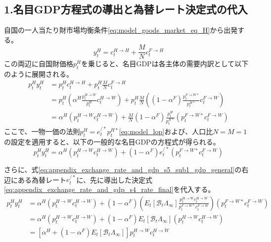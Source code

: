\subsection*{1.名目GDP方程式の導出と為替レート決定式の代入}
\label{sec:appendix_exchange_rate_and_gdp_s5_sub1}

自国の一人当たり財市場均衡条件\eqref{eq:model_goods_market_eq_H}から出発する。
\begin{equation}
    y_t^H=c_t^{H\to H}+\frac{M}{N}c_t^{F\to H}
    \label{eq:appendix_exchange_rate_and_gdp_s5_sub1_goods_raw}
\end{equation}
この両辺に自国財価格\(p_t^H\)を乗じると、名目GDPは各主体の需要内訳として以下のように展開される。
\begin{align}
    p_t^Hy_t^H&=p_t^Hc_t^{H\to H}+p_t^H\frac{M}{N}c_t^{F\to H} \nonumber \\
    &=p_t^H\left(\alpha^H\frac{p_t^{H\to W}}{p_t^H}c_t^{H\to W}\right)+p_t^H\frac{M}{N}\left((1-\alpha^F)\frac{p_t^{F\to W*}}{p_t^{H*}}c_t^{F\to W}\right) \nonumber \\
    &=\alpha^H(p_t^{H\to W}c_t^{H\to W})+\frac{M}{N}(1-\alpha^F)\frac{p_t^H}{p_t^{H*}}(p_t^{F\to W*}c_t^{F\to W})
    \label{eq:appendix_exchange_rate_and_gdp_s5_sub1_gdp_derivation}
\end{align}
ここで、一物一価の法則\(p_t^H=e_t^{/*}p_t^{H*}\)\eqref{eq:model_lop}および、人口比\(N=M=1\)の設定を適用すると、以下の一般的な名目GDPの方程式が得られる。
\begin{equation}
    p_t^Hy_t^H=\alpha^H(p_t^{H\to W}c_t^{H\to W})+(1-\alpha^F)e_t^{/*}(p_t^{F\to W*}c_t^{F\to W})
    \label{eq:appendix_exchange_rate_and_gdp_s5_sub1_gdp_general}
\end{equation}

さらに、式\eqref{eq:appendix_exchange_rate_and_gdp_s5_sub1_gdp_general}の右辺にある為替レート\(e_t^{/*}\)に、先に導出した決定式\eqref{eq:appendix_exchange_rate_and_gdp_s4_rate_final}を代入する。
\begin{align}
    p_t^Hy_t^H&=\alpha^H(p_t^{H\to W}c_t^{H\to W})+(1-\alpha^F)\left(E_t\left[\mathcal{B}_t\Lambda_{\infty}\right]\frac{p_t^{H\to W}c_t^{H\to W}}{p_t^{F\to W*}c_t^{F\to W}}\right)(p_t^{F\to W*}c_t^{F\to W}) \nonumber \\
    &=\alpha^H(p_t^{H\to W}c_t^{H\to W})+(1-\alpha^F)E_t\left[\mathcal{B}_t\Lambda_{\infty}\right](p_t^{H\to W}c_t^{H\to W}) \nonumber \\
    &=\left[\alpha^H+(1-\alpha^F)E_t\left[\mathcal{B}_t\Lambda_{\infty}\right]\right]p_t^{H\to W}c_t^{H\to W}
    \label{eq:appendix_exchange_rate_and_gdp_s5_sub1_gdp_substituted}
\end{align}

